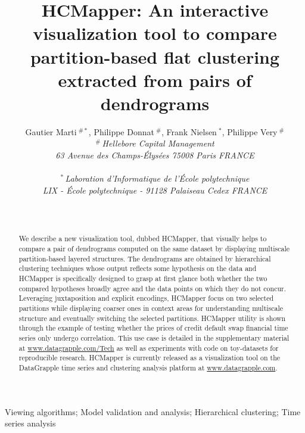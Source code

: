 \documentclass[10pt,conference,a4paper]{IEEEtran}
\title{\textbf{HCMapper}: An interactive visualization tool to compare partition-based
flat clustering extracted from pairs of dendrograms}
\author{{Gautier Marti{\small $~^{\#*}$}, Philippe Donnat{\small $~^{\#}$}, Frank Nielsen{\small $~^{*}$}, Philippe Very{\small $~^{\#}$} } {}
\vspace{1.6mm}\\
\fontsize{10}{10}\selectfont\itshape
$^{\#}$\,Hellebore Capital Management\\ 63 Avenue des Champs-\'Elys\'ees 75008 Paris FRANCE\\ \,\\ 
$^{*}$\,Laboration d'Informatique de l'\'Ecole polytechnique\\ LIX - \'Ecole polytechnique - 91128 Palaiseau Cedex FRANCE\\ \\
\fontsize{9}{9}\selectfont\ttfamily\upshape
\fontsize{10}{10}\selectfont\rmfamily\itshape
\fontsize{9}{9}\selectfont\ttfamily\upshape
\,
}
\begin{document}
\maketitle

\begin{figure}[b]
\parbox{\hsize}{\em


}\end{figure}


\begin{abstract}
We describe a new visualization tool, dubbed HCMapper, that visually helps
to compare a pair of dendrograms computed on the same dataset by displaying multiscale partition-based layered structures.
The dendrograms are obtained by hierarchical clustering techniques whose output reflects some hypothesis on the data and HCMapper
is specifically designed to grasp at first glance both whether the two compared hypotheses broadly agree and the data points on which they do not concur.
Leveraging juxtaposition and explicit encodings, HCMapper focus on two selected partitions while displaying coarser ones in context areas for
understanding multiscale structure and eventually switching the selected partitions.
HCMapper utility is shown through the example of testing whether the prices of credit default swap financial time series only undergo correlation.
This use case is detailed in the supplementary material at \url{www.datagrapple.com/Tech} as well as experiments with code on toy-datasets for reproducible research.
HCMapper is currently released as a visualization tool on the DataGrapple time series and clustering analysis platform at \url{www.datagrapple.com}.
\\[1\baselineskip]
\end{abstract}


\begin{keywords}
Viewing algorithms; Model validation and analysis; Hierarchical clustering; Time series analysis
\end{keywords}
\end{document}
